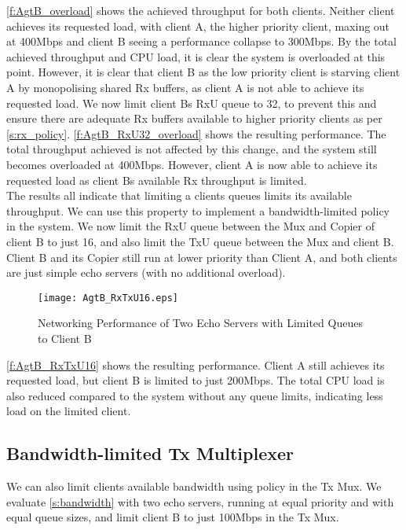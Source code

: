 \autoref{f:AgtB_overload} shows the achieved throughput for both clients. Neither client achieves its requested load, with client A,
the higher priority client, maxing out at 400Mbps and client B seeing a performance collapse to 300Mbps. By the total achieved throughput
and CPU load, it is clear the system is overloaded at this point. However, it is clear that client B as the low priority client is 
starving client A by monopolising shared Rx buffers, as client A is not able to achieve its requested load. We now limit client Bs RxU queue
to 32, to prevent this and ensure there are adequate Rx buffers available to higher priority clients as per \autoref{s:rx_policy}. 
\autoref{f:AgtB_RxU32_overload} shows the resulting performance. The total throughput achieved is not affected by this change, and the
system still becomes overloaded at 400Mbps. However, client A is now able to achieve its requested load as client Bs available
Rx throughput is limited. \\

The results all indicate that limiting a clients queues limits its available throughput. We can use this property to implement 
a bandwidth-limited policy in the system. We now limit the RxU queue between the Mux and Copier of client B to just 16, and also
limit the TxU queue between the Mux and client B. Client B and its Copier still run at lower priority than Client A, and both
clients are just simple echo servers (with no additional overload).

\begin{figure}[h]
    \centering
    \texttt{[image: AgtB\_RxTxU16.eps]}
    \caption{Networking Performance of Two Echo Servers with Limited Queues to Client B}
    \label{f:AgtB_RxTxU16}
\end{figure}

\autoref{f:AgtB_RxTxU16} shows the resulting performance. Client A still achieves its requested load, but client B is limited
to just 200Mbps. The total CPU load is also reduced compared to the system without any queue limits, indicating less load on 
the limited client.

\subsection{Bandwidth-limited Tx Multiplexer}

We can also limit clients available bandwidth using policy in the Tx Mux. We evaluate \autoref{s:bandwidth} with two echo servers,
running at equal priority and with equal queue sizes, and limit client B to just 100Mbps in the Tx Mux. 

